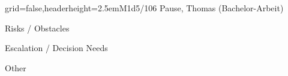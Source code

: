 \documentclass[english]{kiesgrube}
\begin{document}
\begin{poster}{grid=false,headerheight=2.5em}{}{M1d5/106 Pause, Thomas (Bachelor-Arbeit)}{}{}
\begin{posterbox}[name=risks,column=1,below=open]{Risks / Obstacles}
\end{posterbox}
\begin{posterbox}[name=escalation,column=1,below=risks]{Escalation / Decision Needs}
\end{posterbox}
\begin{posterbox}[name=other,column=1,below=escalation]{Other}
\end{posterbox}
\footer{}
\end{poster}

\newpage
\end{document}
